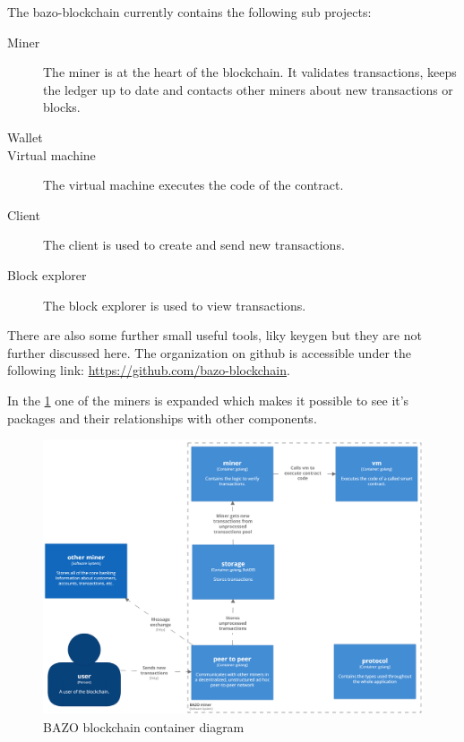 The bazo-blockchain currently contains the following sub projects:
\begin{description}
  \item[Miner] The miner is at the heart of the blockchain. It validates transactions, keeps the ledger up to date and contacts other miners about new transactions or blocks.
  \item[Wallet] 
  \item[Virtual machine] The virtual machine executes the code of the contract.
  \item[Client] The client is used to create and send new transactions.
  \item[Block explorer] The block explorer is used to view transactions.
\end{description}


There are also some further small useful tools, liky keygen but they are not further discussed here. The organization on github is accessible under the following link: \href{https://github.com/bazo-blockchain}{https://github.com/bazo-blockchain}.

In the \ref{systemcontainerdiagram} one of the miners is expanded which makes it possible to see it's packages and their relationships with other components.
\begin{figure}[H]
	\begin{center}
	\includegraphics[width=\textwidth]{./images/BAZO_Container}
	\caption{BAZO blockchain container diagram}
	\label{systemcontainerdiagram}
	\end{center}
\end{figure}
\pagebreak

